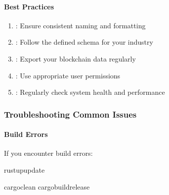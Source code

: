 \documentclass[letterpaper,10pt,english]{sphinxmanual}
\begin{document}
\paragraph{Best Practices}
\label{\detokenize{user-guide/first-steps:best-practices}}\begin{enumerate}
%
\item {} 
\sphinxAtStartPar
{}: Ensure consistent naming and formatting

\item {} 
\sphinxAtStartPar
{}: Follow the defined schema for your industry

\item {} 
\sphinxAtStartPar
{}: Export your blockchain data regularly

\item {} 
\sphinxAtStartPar
{}: Use appropriate user permissions

\item {} 
\sphinxAtStartPar
{}: Regularly check system health and performance

\end{enumerate}


\subsubsection{Troubleshooting Common Issues}
\label{\detokenize{user-guide/first-steps:troubleshooting-common-issues}}

\paragraph{Build Errors}
\label{\detokenize{user-guide/first-steps:build-errors}}
\sphinxAtStartPar
If you encounter build errors:

\begin{sphinxVerbatim}[commandchars=\\\{\}]
rustupupdate

cargoclean
cargobuild\PYGZhy{}\PYGZhy{}release
\end{sphinxVerbatim}
\end{document}
